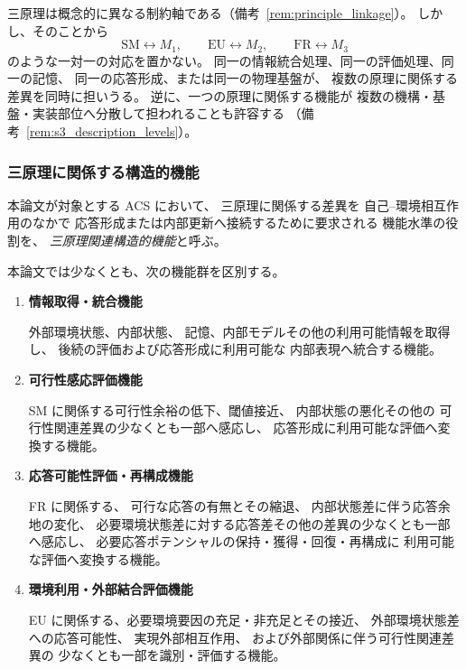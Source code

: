三原理は概念的に異なる制約軸である（備考~\ref{rem:principle_linkage}）。
しかし、そのことから
\[
  \mathrm{SM}\leftrightarrow M_1,
  \qquad
  \mathrm{EU}\leftrightarrow M_2,
  \qquad
  \mathrm{FR}\leftrightarrow M_3
\]
のような一対一の対応を置かない。
同一の情報統合処理、同一の評価処理、同一の記憶、
同一の応答形成、または同一の物理基盤が、
複数の原理に関係する差異を同時に担いうる。
逆に、一つの原理に関係する機能が
複数の機構・基盤・実装部位へ分散して担われることも許容する
（備考~\ref{rem:s3_description_levels}）。

\subsubsection{三原理に関係する構造的機能}

\begin{definition}
\label{def:principle_related_functions}
本論文が対象とする ACS において、
三原理に関係する差異を
自己--環境相互作用のなかで
応答形成または内部更新へ接続するために要求される
機能水準の役割を、
\emph{三原理関連構造的機能}と呼ぶ。

本論文では少なくとも、次の機能群を区別する。

\begin{enumerate}

  \item
  \textbf{情報取得・統合機能}

  外部環境状態、内部状態、
  記憶、内部モデルその他の利用可能情報を取得し、
  後続の評価および応答形成に利用可能な
  内部表現へ統合する機能。

  \item
  \textbf{可行性感応評価機能}

  SM に関係する可行性余裕の低下、閾値接近、
  内部状態の悪化その他の
  可行性関連差異の少なくとも一部へ感応し、
  応答形成に利用可能な評価へ変換する機能。

  \item
  \textbf{応答可能性評価・再構成機能}

  FR に関係する、
  可行な応答の有無とその縮退、
  内部状態差に伴う応答余地の変化、
  必要環境状態差に対する応答差その他の差異の少なくとも一部へ感応し、
  必要応答ポテンシャルの保持・獲得・回復・再構成に
  利用可能な評価へ変換する機能。

  \item
  \textbf{環境利用・外部結合評価機能}

  EU に関係する、必要環境要因の充足・非充足とその接近、
  外部環境状態差への応答可能性、
  実現外部相互作用、
  および外部関係に伴う可行性関連差異の
  少なくとも一部を識別・評価する機能。


\end{enumerate}
\end{definition}
